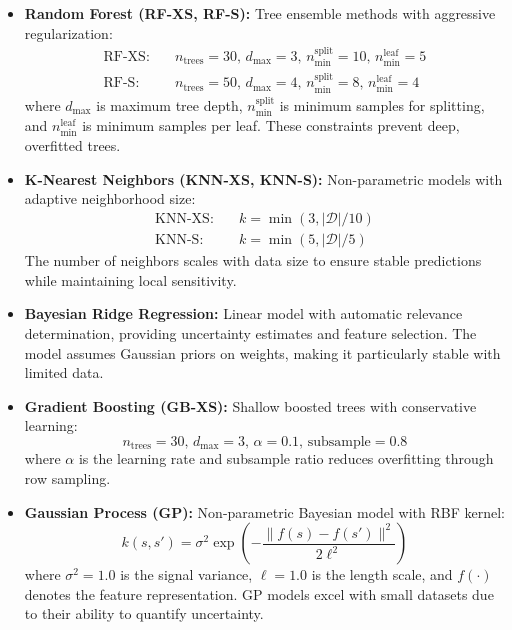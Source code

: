 \documentclass[conference]{IEEEtran}
\begin{document}
\begin{itemize}
    \item \textbf{Random Forest (RF-XS, RF-S):} Tree ensemble methods with aggressive regularization:
    \begin{align}
    \text{RF-XS:} \quad & n_{\text{trees}} = 30, \, d_{\max} = 3, \, n_{\min}^{\text{split}} = 10, \, n_{\min}^{\text{leaf}} = 5 \\
    \text{RF-S:} \quad & n_{\text{trees}} = 50, \, d_{\max} = 4, \, n_{\min}^{\text{split}} = 8, \, n_{\min}^{\text{leaf}} = 4
    \end{align}
    where $d_{\max}$ is maximum tree depth, $n_{\min}^{\text{split}}$ is minimum samples for splitting, and $n_{\min}^{\text{leaf}}$ is minimum samples per leaf. These constraints prevent deep, overfitted trees.
    
    \item \textbf{K-Nearest Neighbors (KNN-XS, KNN-S):} Non-parametric models with adaptive neighborhood size:
    \begin{align}
    \text{KNN-XS:} \quad & k = \min(3, |\mathcal{D}|/10) \\
    \text{KNN-S:} \quad & k = \min(5, |\mathcal{D}|/5)
    \end{align}
    The number of neighbors scales with data size to ensure stable predictions while maintaining local sensitivity.
    
    \item \textbf{Bayesian Ridge Regression:} Linear model with automatic relevance determination, providing uncertainty estimates and feature selection. The model assumes Gaussian priors on weights, making it particularly stable with limited data.
    
    \item \textbf{Gradient Boosting (GB-XS):} Shallow boosted trees with conservative learning:
    \begin{equation}
    n_{\text{trees}} = 30, \, d_{\max} = 3, \, \alpha = 0.1, \, \text{subsample} = 0.8
    \end{equation}
    where $\alpha$ is the learning rate and subsample ratio reduces overfitting through row sampling.
    
    \item \textbf{Gaussian Process (GP):} Non-parametric Bayesian model with RBF kernel:
    \begin{equation}
    k(s, s') = \sigma^2 \exp\left(-\frac{\|f(s) - f(s')\|^2}{2\ell^2}\right)
    \end{equation}
    where $\sigma^2 = 1.0$ is the signal variance, $\ell = 1.0$ is the length scale, and $f(\cdot)$ denotes the feature representation. GP models excel with small datasets due to their ability to quantify uncertainty.
    

\end{itemize}
\end{document}
